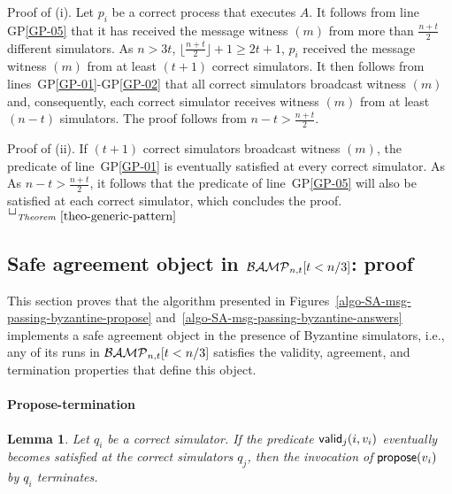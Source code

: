 \documentclass[11pt,letterpaper]{article}
\newtheorem{lemma}{Lemma}
\newlength {\afterproof}
\newcommand{\toto}{xxx}
\newenvironment{proofT}{\noindent{\bf Proof }}
{\hspace*{\fill}$\Box_{\mathit{Theorem}~\ref{\toto}}$\par\vspace{\afterproof}}
\newcommand{\BM}{{\cal BAMP}_{n,t}}
\begin{document}
\begin{proofT}
Proof of (i). Let $p_i$ be a correct process that executes $A$.
It follows from line GP\ref{GP-05} that it has received the message
{\sc witness} $(m)$ from more than $\frac{n+t}{2}$ different simulators.
As $n>3t$, $\lfloor \frac{n+t}{2}\rfloor +1 \geq 2t+1$,
$p_i$ received the message {\sc witness} $(m)$ from at least $(t+1)$
correct simulators. It then follows from lines~GP\ref{GP-01}-GP\ref{GP-02}
that all correct simulators broadcast {\sc witness} $(m)$ and, consequently,
each correct simulator receives {\sc witness} $(m)$ from at least $(n-t)$
simulators. The proof follows from $n-t > \frac{n+t}{2}$.


Proof of (ii). If $(t+1)$ correct simulators broadcast {\sc witness} $(m)$,
the predicate of line~GP\ref{GP-01} is eventually  satisfied
at every correct simulator.  As  As $n-t> \frac{n+t}{2}$,
it follows that the predicate of line~GP\ref{GP-05}  will also be
satisfied at each correct simulator, which concludes the proof.
\renewcommand{\toto}{theo-generic-pattern}
\end{proofT}
\subsection{Safe agreement object in $\BM[t<n/3]$: proof}
This section proves that the algorithm presented in
Figures~\ref{algo-SA-msg-passing-byzantine-propose}
and~\ref{algo-SA-msg-passing-byzantine-answers} implements a
safe agreement object in the presence of Byzantine simulators,
i.e., any of its runs in  $\BM[t<n/3]$  satisfies the validity, agreement,
and termination properties that define this object.



\paragraph{Propose-termination}

\begin{lemma}
\label{lemma-termination-if-valid}
Let $q_i$ be a correct simulator.
If the predicate ${\sf valid}_j(i,v_i)$ eventually becomes satisfied
at the correct simulators $q_j$,
then the invocation of ${\sf propose}(v_i)$ by $q_i$ terminates.
\end{lemma}
\end{document}
